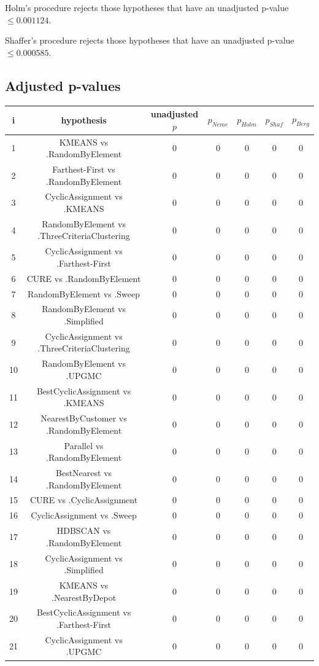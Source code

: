 \documentclass[a4paper,10pt]{article}
\begin{document}
\begin{landscape}
Holm's procedure rejects those hypotheses that have an unadjusted p-value $\le0.001124$.

Shaffer's procedure rejects those hypotheses that have an unadjusted p-value $\le0.000585$.

\pagebreak

\subsection{Adjusted p-values}

\begin{table}[!htp]
\centering\scriptsize
\begin{tabular}{ccccccc}
i&hypothesis&unadjusted $p$&$p_{Neme}$&$p_{Holm}$&$p_{Shaf}$&$p_{Berg}$\\
\hline1&KMEANS vs .RandomByElement&0&0&0&0&0\\
2&Farthest-First vs .RandomByElement&0&0&0&0&0\\
3&CyclicAssignment vs .KMEANS&0&0&0&0&0\\
4&RandomByElement vs .ThreeCriteriaClustering&0&0&0&0&0\\
5&CyclicAssignment vs .Farthest-First&0&0&0&0&0\\
6&CURE vs .RandomByElement&0&0&0&0&0\\
7&RandomByElement vs .Sweep&0&0&0&0&0\\
8&RandomByElement vs .Simplified&0&0&0&0&0\\
9&CyclicAssignment vs .ThreeCriteriaClustering&0&0&0&0&0\\
10&RandomByElement vs .UPGMC&0&0&0&0&0\\
11&BestCyclicAssignment vs .KMEANS&0&0&0&0&0\\
12&NearestByCustomer vs .RandomByElement&0&0&0&0&0\\
13&Parallel vs .RandomByElement&0&0&0&0&0\\
14&BestNearest vs .RandomByElement&0&0&0&0&0\\
15&CURE vs .CyclicAssignment&0&0&0&0&0\\
16&CyclicAssignment vs .Sweep&0&0&0&0&0\\
17&HDBSCAN vs .RandomByElement&0&0&0&0&0\\
18&CyclicAssignment vs .Simplified&0&0&0&0&0\\
19&KMEANS vs .NearestByDepot&0&0&0&0&0\\
20&BestCyclicAssignment vs .Farthest-First&0&0&0&0&0\\
21&CyclicAssignment vs .UPGMC&0&0&0&0&0\\

\end{tabular}
\end{table}
\end{landscape}
\end{document}
